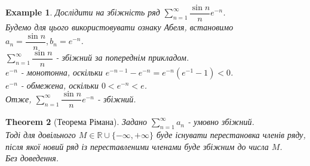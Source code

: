 \documentclass[a4paper, 10pt]{article}
\def\huge{\displaystyle}
\theoremstyle{theoremdd}
\newtheorem{theorem}{Theorem}[subsection]
\theoremstyle{theoremdd}
\theoremstyle{theoremdd}
\theoremstyle{theoremdd}
\theoremstyle{theoremdd}
\newtheorem{example}[theorem]{Example}
\theoremstyle{theoremdd}
\theoremstyle{theoremdd}
\theoremstyle{theoremdd}
\theoremstyle{theoremdd}
\begin{document}
\begin{example}
Дослідити на збіжність ряд $\huge\sum_{n=1}^\infty \dfrac{\sin n}{n} e^{-n}$.\\
Будемо для цього використовувати ознаку Абеля, встановимо $a_n = \dfrac{\sin n}{n}, b_n = e^{-n}$.\\
$\huge\sum_{n=1}^\infty \dfrac{\sin n}{n}$ - збіжний за попереднім прикладом.\\
$e^{-n}$ - монотонна, оскільки $e^{-n-1} - e^{-n} = e^{-n} (e^{-1} - 1) < 0$.\\
$e^{-n}$ - обмежена, оскільки $0 < e^{-n} < e$.\\
Отже, $\huge\sum_{n=1}^\infty \dfrac{\sin n}{n} e^{-n}$ - збіжний.
\end{example}

\begin{theorem}[Теорема Рімана]
Задано $\huge \sum_{n=1}^\infty a_n$ - умовно збіжний.\\
Тоді для довільного $M \in \mathbb{R} \cup \{-\infty, +\infty\}$ буде існувати перестановка членів ряду, після якої новий ряд із переставленими членами буде збіжним до числа $M$.\\
\textit{Без доведення.}
\end{theorem}
\end{document}
